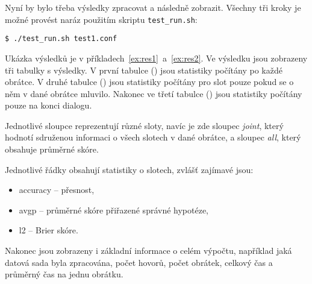 Nyní by bylo třeba výsledky zpracovat a následně zobrazit.
Všechny tři kroky je možné provést naráz použitím skriptu \texttt{test\_run.sh}:

\begin{verbatim}
$ ./test_run.sh test1.conf
\end{verbatim}

Ukázka výsledků je v příkladech~\ref{ex:res1}~a~\ref{ex:res2}. 
Ve výsledku jsou zobrazeny tři tabulky s výsledky. 
V první tabulce () jsou statistiky počítány po každé obrátce.
V druhé tabulce () jsou statistiky počítány pro slot pouze pokud se o něm v dané obrátce mluvilo.
Nakonec ve třetí tabulce () jsou statistiky počítány pouze na konci dialogu.

Jednotlivé sloupce reprezentují různé sloty, navíc je zde sloupec \emph{joint}, který hodnotí sdruženou informaci o všech slotech v dané obrátce, a sloupec \emph{all}, který obsahuje průměrné skóre.

Jednotlivé řádky obsahují statistiky o slotech, zvlášť zajímavé jsou:
\begin{itemize}
\item accuracy -- přesnost,
\item avgp -- průměrné skóre přiřazené správné hypotéze,
\item l2 -- Brier skóre.
\end{itemize}

Nakonec jsou zobrazeny i základní informace o celém výpočtu, například jaká datová sada byla zpracována, počet hovorů, počet obrátek, celkový čas a průměrný čas na jednu obrátku.

